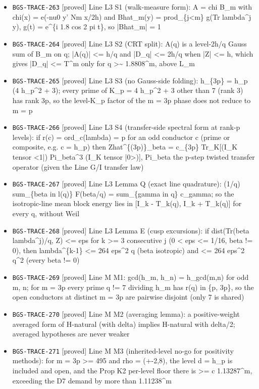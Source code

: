\begin{itemize}
  \item \texttt{BGS-TRACE-263} [proved] Line L3 S1 (walk-measure form): A = chi B\_m with chi(x) = e(-nu0 y' Nm x/2h) and Bhat\_m(y) = prod\_\{j<m\} g(Tr lambda\textasciicircum{}j y), g(t) = e\textasciicircum{}\{i 1.8 cos 2 pi t\}, so |Bhat\_m| = 1
  \item \texttt{BGS-TRACE-264} [proved] Line L3 S2 (CRT split): A(q) is a level-2h/q Gauss sum of B\_m on q; |A(q)| <= h/q and |D\_q| <= 2h/q when |Z| <= h, which gives |D\_q| <= T\textasciicircum{}m only for q >\textasciitilde{} 1.8808\textasciicircum{}m, above L\_m
  \item \texttt{BGS-TRACE-265} [proved] Line L3 S3 (no Gauss-side folding): h\_\{3p\} = h\_p (4 h\_p\textasciicircum{}2 + 3); every prime of K\_p = 4 h\_p\textasciicircum{}2 + 3 other than 7 (rank 3) has rank 3p, so the level-K\_p factor of the m = 3p phase does not reduce to m = p
  \item \texttt{BGS-TRACE-266} [proved] Line L3 S4 (transfer-side spectral form at rank-p levels): if r(c) = ord\_c(lambda) = p for an odd conductor c (prime or composite, e.g. c = h\_p) then Zhat\textasciicircum{}\{(3p)\}\_beta = c\_\{3p\} Tr\_K[(I\_K tensor <1|) Pi\_beta\textasciicircum{}3 (I\_K tensor |0>)], Pi\_beta the p-step twisted transfer operator (given the Line G/I transfer law)
  \item \texttt{BGS-TRACE-267} [proved] Line L3 Lemma Q (exact line quadrature): (1/q) sum\_\{beta in l(q)\} F(beta/q) = sum\_\{gamma in q\} c\_gamma; so the isotropic-line mean block energy lies in [I\_k - T\_k(q), I\_k + T\_k(q)] for every q, without Weil
  \item \texttt{BGS-TRACE-268} [proved] Line L3 Lemma E (cusp excursions): if dist(Tr(beta lambda\textasciicircum{}j)/q, Z) <= eps for k >= 3 consecutive j (0 < eps <= 1/16, beta != 0), then lambda\textasciicircum{}\{k-1\} <= 264 eps\textasciicircum{}2 q (beta isotropic) and <= 264 eps\textasciicircum{}2 q\textasciicircum{}2 (every beta != 0)
  \item \texttt{BGS-TRACE-269} [proved] Line M M1: gcd(h\_m, h\_n) = h\_gcd(m,n) for odd m, n; for m = 3p every prime q != 7 dividing h\_m has r(q) in \{p, 3p\}, so the open conductors at distinct m = 3p are pairwise disjoint (only 7 is shared)
  \item \texttt{BGS-TRACE-270} [proved] Line M M2 (averaging lemma): a positive-weight averaged form of H-natural (with delta) implies H-natural with delta/2; averaged hypotheses are never weaker
  \item \texttt{BGS-TRACE-271} [proved] Line M M3 (inherited-level no-go for positivity methods): for m = 3p >= 495 and rho = (+-2,8), the level d = h\_p is included and open, and the Prop K2 per-level floor there is >= c 1.13287\textasciicircum{}m, exceeding the D7 demand by more than 1.11238\textasciicircum{}m

\end{itemize}
